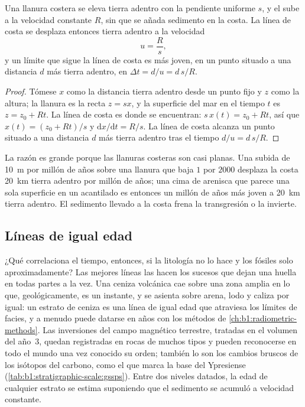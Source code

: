 \begin{proposition}\label{prop:b1:stratigraphic-scale:transgression}
Una llanura costera se eleva tierra adentro con la pendiente uniforme $s$, y el  sube a la velocidad constante $R$, sin que se añada sedimento en la costa. La línea de costa se
desplaza entonces tierra adentro a la velocidad
\[
  u = \frac{R}{s},
\]
y un límite que sigue la línea de costa es más joven, en un punto situado a una distancia $d$ más tierra adentro, en
$\Delta t = d/u = d\,s/R$.
\end{proposition}

\begin{proof}
Tómese $x$ como la distancia tierra adentro desde un punto fijo y $z$ como la altura; la llanura es la recta $z = s x$, y la superficie del mar en el tiempo $t$ es
$z = z_0 + R t$. La línea de costa es donde se encuentran: $s\,x(t) = z_0 + R t$, así que
$x(t) = (z_0 + R t)/s$ y $\mathrm dx/\mathrm dt = R/s$. La línea de costa alcanza un punto situado a una distancia $d$ más tierra adentro tras el tiempo $d/u = d\,s/R$.
\end{proof}

La razón es grande porque las llanuras costeras son casi planas. Una subida de \qty{10}{m} por millón de años sobre una llanura que baja $1$ por $2000$ desplaza la costa
\qty{20}{km} tierra adentro por millón de años; una cima de arenisca que parece una sola superficie en un acantilado es entonces un millón de años más joven a \qty{20}{km} tierra adentro.
El sedimento llevado a la costa frena la transgresión o la invierte.

\subsection*{Líneas de igual edad}

¿Qué correlaciona el tiempo, entonces, si la litología no lo hace y los fósiles solo aproximadamente? Las mejores líneas las hacen los sucesos que dejan una huella en todas partes a la vez. Una
ceniza volcánica cae sobre una zona amplia en lo que, geológicamente, es un instante, y se asienta sobre arena, lodo y caliza por igual: un estrato de ceniza es una línea de igual edad que atraviesa los
límites de facies, y a menudo puede datarse en años con los métodos de \cref{ch:b1:radiometric-methods}. Las inversiones del campo magnético terrestre, tratadas en el volumen del año~3, quedan
registradas en rocas de muchos tipos y pueden reconocerse en todo el mundo una vez conocido su orden; también lo son los cambios bruscos de los isótopos del carbono, como el que marca la base del
Ypresiense (\cref{tab:b1:stratigraphic-scale:gssps}). Entre dos niveles datados, la edad de cualquier estrato se estima suponiendo que el sedimento se acumuló a velocidad constante.

